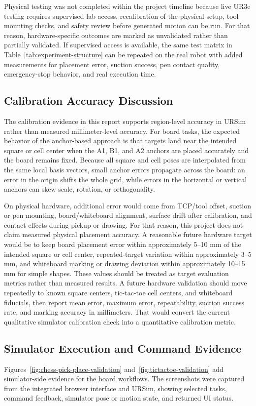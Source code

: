 \documentclass[12pt]{article}
\begin{document}
Physical testing was not completed within the project timeline because live UR3e testing requires supervised lab access, recalibration of the physical setup, tool mounting checks, and safety review before generated motion can be run. For that reason, hardware-specific outcomes are marked as unvalidated rather than partially validated. If supervised access is available, the same test matrix in Table~\ref{tab:experiment-structure} can be repeated on the real robot with added measurements for placement error, suction success, pen contact quality, emergency-stop behavior, and real execution time.

\subsection{Calibration Accuracy Discussion}
The calibration evidence in this report supports region-level accuracy in URSim rather than measured millimeter-level accuracy. For board tasks, the expected behavior of the anchor-based approach is that targets land near the intended square or cell center when the A1, B1, and A2 anchors are placed accurately and the board remains fixed. Because all square and cell poses are interpolated from the same local basis vectors, small anchor errors propagate across the board: an error in the origin shifts the whole grid, while errors in the horizontal or vertical anchors can skew scale, rotation, or orthogonality.

On physical hardware, additional error would come from TCP/tool offset, suction or pen mounting, board/whiteboard alignment, surface drift after calibration, and contact effects during pickup or drawing. For that reason, this project does not claim measured physical placement accuracy. A reasonable future hardware target would be to keep board placement error within approximately 5--10 mm of the intended square or cell center, repeated-target variation within approximately 3--5 mm, and whiteboard marking or drawing deviation within approximately 10--15 mm for simple shapes. These values should be treated as target evaluation metrics rather than measured results. A future hardware validation should move repeatedly to known square centers, tic-tac-toe cell centers, and whiteboard fiducials, then report mean error, maximum error, repeatability, suction success rate, and marking accuracy in millimeters. That would convert the current qualitative simulator calibration check into a quantitative calibration metric.

\subsection{Simulator Execution and Command Evidence}
Figures~\ref{fig:chess-pick-place-validation} and~\ref{fig:tictactoe-validation} add simulator-side evidence for the board workflows. The screenshots were captured from the integrated browser interface and URSim, showing selected tasks, command feedback, simulator pose or motion state, and returned UI status.
\end{document}
